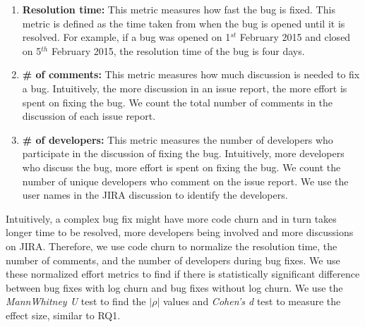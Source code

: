 \begin{enumerate}
	\item \textbf{Resolution time:} This metric measures how fast the bug is fixed. This metric is defined as the time taken from when the bug is opened until it is resolved. For example, if a bug was opened on 1$ ^{st}$ February 2015 and closed on 5$ ^{th}$ February 2015, the resolution time of the bug is four days. 
	
	\item \textbf {\# of comments:} This metric measures how much discussion is needed to fix a bug. Intuitively, the more discussion in an issue report, the more effort is spent on fixing the bug. We count the total number of comments in the discussion of each issue report.
	
	\item \textbf {\# of developers:} This metric measures the number of developers who participate in the discussion of fixing the bug. Intuitively, more developers who discuss the bug, more effort is spent on fixing the bug. We count the number of unique developers who comment on the issue report. We use the user names in the JIRA discussion to identify the developers. 
\end{enumerate}
Intuitively, a complex bug fix might have more code churn and in turn takes longer time to be resolved, more developers being involved and more discussions on JIRA. Therefore, we use code churn to normalize the resolution time, the number of comments, and the number of developers during bug fixes. We use these normalized effort metrics to find if there is statistically significant difference between bug fixes with log churn and bug fixes without log churn. We use the {\em MannWhitney U} test to find the $|\rho|$ values and \textsl{Cohen's d} test to measure the effect size, similar to RQ1. 






